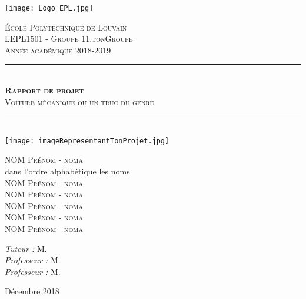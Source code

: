 \documentclass{report}
\newcommand{\HRule}{\rule{\linewidth}{0.5mm}}
\begin{document}
\begin{titlepage}
  \begin{sffamily}
  \begin{center}

    \texttt{[image: Logo\_EPL.jpg]}~
    

    \textsc{\LARGE École Polytechnique de Louvain}\\[1cm]
    \textsc{\LARGE LEPL1501 -  Groupe 11.tonGroupe}\\[1cm]
    \textsc {Année académique 2018-2019}
    
    \HRule \\[0.4cm]
    { \huge  \textsc\bfseries{ Rapport de projet}\\[0.4cm] }
    {\Large\textsc{Voiture mécanique ou un truc du genre}}

    \HRule \\[2cm]
    \texttt{[image: imageRepresentantTonProjet.jpg]}
    \\[1,5cm]

    \begin{minipage}{0.4\textwidth}
      \begin{flushleft} \large
        NOM \textsc{Prénom - noma}\\
        dans l'ordre alphabétique les noms\\
        NOM \textsc{Prénom - noma}\\
        NOM \textsc{Prénom - noma}\\
        NOM \textsc{Prénom - noma}\\
        NOM \textsc{Prénom - noma}\\
        NOM \textsc{Prénom - noma}\\
        
      \end{flushleft}
    \end{minipage}
    \begin{minipage}{0.4\textwidth}
      \begin{flushright} \large
        \emph{Tuteur :} M. \textsc{}\\
        \emph{Professeur :} M. \textsc{}\\
        \emph{Professeur :} M. \textsc{}\\
      \end{flushright}
    \end{minipage}

    \vfill

    {\large {} Décembre 2018}

  \end{center}
  \end{sffamily}
\end{titlepage}
\end{document}
